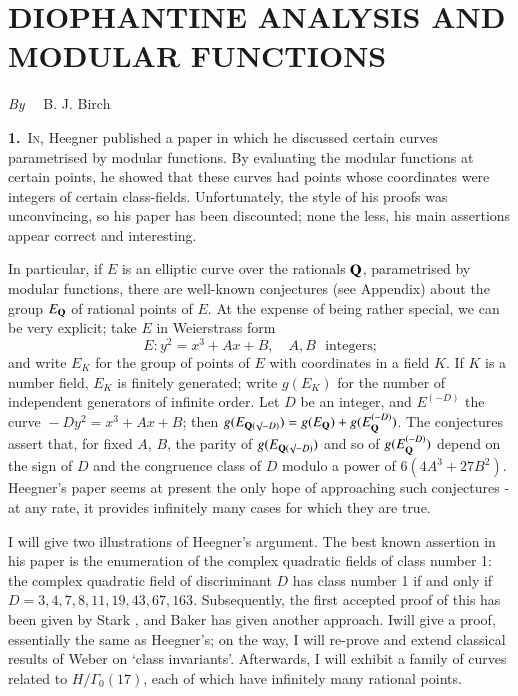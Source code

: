 \chapter[\textsc{B. J. Birch} : Diophantine Analysis and Modular Functions]{DIOPHANTINE ANALYSIS AND MODULAR FUNCTIONS}\label{art03}

\begin{center}
{\em By}~~ B. J. Birch
\end{center}


\setcounter{pageoriginal}{34}
\noindent
{\bf 1.}~\textsc{In}, Heegner published a paper \cite{art03-key5} in which he discussed certain curves parametrised by modular functions. By evaluating the modular functions at certain points, he showed that these curves had points whose coordinates were integers of certain class-fields. Unfortunately, the style of his proofs was unconvincing, so his paper has been discounted; none the less, his main assertions appear correct and interesting.

In particular, if $E$ is an elliptic curve over the rationals $\mathbf{Q}$, para\-metrised by modular functions, there are well-known conjectures (see Appendix) about the group $E_{\mathbf{Q}}$ of rational points of $E$. At the expense of being rather special, we can be very explicit; take $E$ in Weierstrass form
$$
E:y^{2}=x^{3}+Ax+B,\quad A, B \text{~ integers;}
$$
and write $E_{K}$ for the group of points of $E$ with coordinates in a field $K$. If $K$ is a number field, $E_{K}$ is finitely generated; write $g(E_{K})$ for the number of independent generators of infinite order. Let $D$ be an integer, and $E^{(-D)}$ the curve ${}-Dy^{2}=x^{3}+Ax+B$; then $g(E_{\mathbf{Q}(\surd-D)})=g(E_{\mathbf{Q}})+g(E_{\mathbf{Q}}^{(-D)})$. The conjectures assert that, for fixed $A$, $B$, the parity of $g(E_{\mathbf{Q}(\surd-D)})$ and so of $g(E_{\mathbf{Q}}^{(-D)})$ depend on the sign of $D$ and the congruence class of $D$ modulo a power of $6(4A^{3}+27B^{2})$. Heegner's paper seems at present the only hope of approaching such conjectures - at any rate, it provides infinitely many cases for which they are true.

I will give two illustrations of Heegner's argument. The best known assertion in his paper is the enumeration of the complex quadratic fields of class number 1: the complex quadratic field of discriminant $D$ has class number 1 if and only if $D=3,4,7,8,11,19,43,67,163$. Subsequently, the first accepted proof of this has been given by Stark \cite{art03-key7}, and Baker \cite{art03-key1} has given another approach. I\pageoriginale will give a proof, essentially the same as Heegner's; on the way, I will re-prove and extend classical results of Weber \cite{art03-key9} on `class invariants'. Afterwards, I will exhibit a family of curves related to $H/\Gamma_{0}(17)$, each of which have infinitely many rational points.

